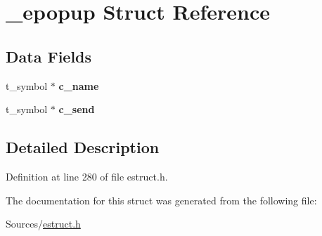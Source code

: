 \hypertarget{struct__epopup}{\section{\-\_\-epopup Struct Reference}
\label{struct__epopup}
}
\subsection*{Data Fields}
\begin{DoxyCompactItemize}
\item 
\hypertarget{struct__epopup_a6b1d595c3eed41231261cc949de6c059}{t\-\_\-symbol $\ast$ {\bfseries c\-\_\-name}}\label{struct__epopup_a6b1d595c3eed41231261cc949de6c059}

\item 
\hypertarget{struct__epopup_a8b8515ab22b24ef7b726fc06af1254fe}{t\-\_\-symbol $\ast$ {\bfseries c\-\_\-send}}\label{struct__epopup_a8b8515ab22b24ef7b726fc06af1254fe}

\end{DoxyCompactItemize}


\subsection{Detailed Description}


Definition at line 280 of file estruct.\-h.



The documentation for this struct was generated from the following file\-:\begin{DoxyCompactItemize}
\item 
Sources/\hyperlink{estruct_8h}{estruct.\-h}\end{DoxyCompactItemize}
